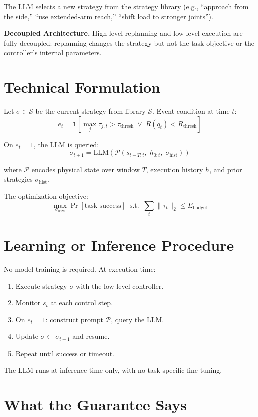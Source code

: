 \documentclass[10pt,twocolumn]{article}
\begin{document}
The LLM selects a new strategy from the strategy library (e.g., ``approach
from the side,'' ``use extended-arm reach,'' ``shift load to stronger joints'').

\textbf{Decoupled Architecture.} High-level replanning and low-level
execution are fully decoupled: replanning changes the strategy but not the
task objective or the controller's internal parameters.

\section{Technical Formulation}

Let $\sigma \in \mathcal{S}$ be the current strategy from library $\mathcal{S}$.
Event condition at time $t$:
\[
e_t = \mathbf{1}\!\left[
  \max_j \tau_{j,t} > \tau_\text{thresh}
  \;\vee\;
  R(q_t) < R_\text{thresh}
\right]
\]

On $e_t = 1$, the LLM is queried:
\[
\sigma_{t+1} = \mathrm{LLM}\!\left(
  \mathcal{P}(s_{t-T:t},\; h_{0:t},\; \sigma_\text{hist})
\right)
\]

where $\mathcal{P}$ encodes physical state over window $T$, execution
history $h$, and prior strategies $\sigma_\text{hist}$.

The optimization objective:
\[
\max_{\sigma_{0:\infty}} \Pr[\text{task success}]
\;\;\text{s.t.}\;\;
\sum_t \|\tau_t\|_2 \leq E_\text{budget}
\]

\section{Learning or Inference Procedure}

No model training is required. At execution time:
\begin{enumerate}[itemsep=2pt,parsep=0pt]
  \item Execute strategy $\sigma$ with the low-level controller.
  \item Monitor $s_t$ at each control step.
  \item On $e_t = 1$: construct prompt $\mathcal{P}$, query the LLM.
  \item Update $\sigma \leftarrow \sigma_{t+1}$ and resume.
  \item Repeat until success or timeout.
\end{enumerate}

The LLM runs at inference time only, with no task-specific fine-tuning.

\section{What the Guarantee Says}
\end{document}
